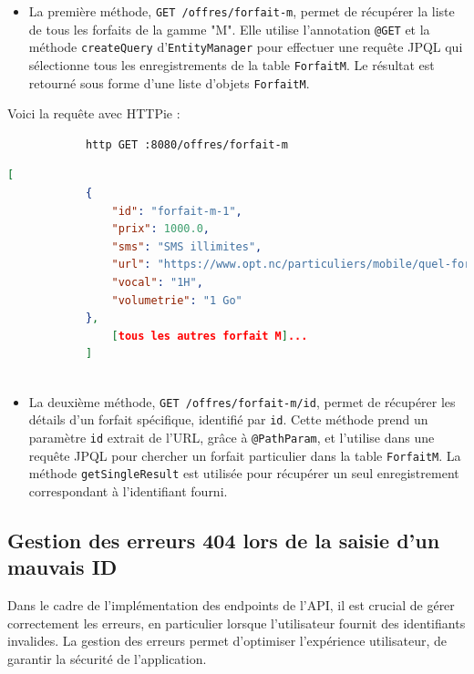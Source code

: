 \documentclass[11pt]{article}
\begin{document}
		\begin{itemize}
			\item La première méthode, \texttt{GET /offres/forfait-m}, permet de récupérer la liste de tous les forfaits de la gamme "M". 
			Elle utilise l'annotation \texttt{@GET} et la méthode \texttt{createQuery} d'\texttt{EntityManager} pour effectuer une requête JPQL qui sélectionne tous les enregistrements de la table \texttt{ForfaitM}. 
			Le résultat est retourné sous forme d'une liste d'objets \texttt{ForfaitM}.
		\end{itemize}
		
		Voici la requête avec HTTPie : 
		
		\begin{lstlisting}
			http GET :8080/offres/forfait-m
		\end{lstlisting}
		\begin{lstlisting}[language=json]
			[
			{
				"id": "forfait-m-1",
				"prix": 1000.0,
				"sms": "SMS illimites",
				"url": "https://www.opt.nc/particuliers/mobile/quel-forfait-choisir/forfait-m-1-go",
				"vocal": "1H",
				"volumetrie": "1 Go"
			},
				[tous les autres forfait M]...
			]
			
		\end{lstlisting}
		
		\begin{itemize}
			\item La deuxième méthode, \texttt{GET /offres/forfait-m/{id}}, permet de récupérer les détails d'un forfait spécifique, identifié par \texttt{id}. 
			Cette méthode prend un paramètre \texttt{id} extrait de l'URL, grâce à \texttt{@PathParam}, et l'utilise dans une requête JPQL pour chercher un forfait particulier dans la table \texttt{ForfaitM}. 
			La méthode \texttt{getSingleResult} est utilisée pour récupérer un seul enregistrement correspondant à l'identifiant fourni.
		\end{itemize}
		\subsection*{Gestion des erreurs 404 lors de la saisie d'un mauvais ID}
		\label{subsec:error-handling}
		
		Dans le cadre de l'implémentation des endpoints de l'API, il est crucial de gérer correctement les erreurs, en particulier lorsque l'utilisateur fournit des identifiants invalides. La gestion des erreurs permet d'optimiser l'expérience utilisateur, de garantir la sécurité de l'application.
		
\end{document}
